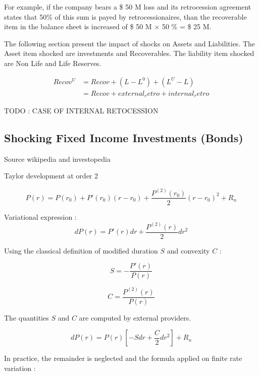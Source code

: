 For example, if the company bears a \$ 50 M loss and its retrocession agreement states that 50\% of this sum is payed by retrocessionaires, than the recoverable item in the balance sheet is increased of \$ 50 M $\times$ 50 \% = \$ 25 M.


The following section present the impact of shocks on Assets and Liabilities. The Asset item shocked are investments and Recoverables. The liability item shocked are Non Life and Life Reserves.


\begin{align}
    Recov^U &= Recov + (L - L^0) + (L^U - L) \\
            &= Recov + external_retro + internal_retro
\end{align}


TODO : CASE OF INTERNAL RETOCESSION



\subsection{Shocking Fixed Income Investments (Bonds)}
Source wikipedia and investopedia

Taylor development at order 2

\begin{equation}
	P(r) = P(r_0) + P'(r_0)(r - r_0) + \frac{P^{(2)}(r_0)}{2}(r - r_0)^2 + R_n
\end{equation}

Variational expression :
\begin{equation}
	dP(r) = P'(r) dr + \frac{P^{(2)}(r)}{2} d r^2
\end{equation}

Using the classical definition of modified duration $S$ and convexity $C$ :

\begin{equation}
	S = - \frac{ P'(r)}{ P(r)}
\end{equation}

\begin{equation}
	C = \frac{ P^{(2)}(r)}{ P(r)}
\end{equation}

The quantities $S$ and $C$ are computed by external providers.

\begin{equation}
	dP(r) = P(r) \left[ -S dr + \frac{C}{2} d r^2 \right] + R_n
\end{equation}

In practice, the remainder is neglected and the formula applied on finite rate variation :

